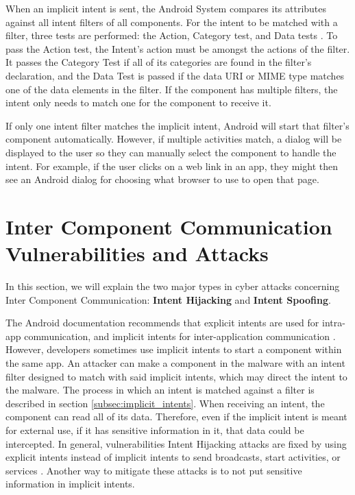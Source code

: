     When an implicit intent is sent, the Android System compares its attributes against all intent filters of all components. For the intent to be matched with a filter, three tests are performed: the Action, Category test, and Data tests \cite{intents_and_intent_filters}. To pass the Action test, the Intent’s action must be amongst the actions of the filter. It passes the Category Test if all of its categories are found in the filter’s declaration, and the Data Test is passed if the data URI or MIME type matches one of the data elements in the filter. If the component has multiple filters, the intent only needs to match one for the component to receive it.
    
    If only one intent filter matches the implicit intent, Android will start that filter’s component automatically. However, if multiple activities match, a dialog will be displayed to the user so they can manually select the component to handle the intent. For example, if the user clicks on a web link in an app, they might then see an Android dialog for choosing what browser to use to open that page.
    
    \section{Inter Component Communication Vulnerabilities and Attacks}
        \label{sec:icc_vulnerabilities_and_attacks}
        
    In this section, we will explain the two major types in cyber attacks concerning Inter Component Communication: \textbf{Intent Hijacking} and \textbf{Intent Spoofing}.
        
    The Android documentation recommends that explicit intents are used for intra-app communication, and implicit intents for inter-application communication \cite{intents_and_intent_filters}. However, developers sometimes use implicit intents to start a component within the same app. An attacker can make a component in the malware with an intent filter designed to match with said implicit intents, which may direct the intent to the malware. The process in which an intent is matched against a filter is described in section \ref{subsec:implicit_intents}. When receiving an intent, the component can read all of its data. Therefore, even if the implicit intent is meant for external use, if it has sensitive information in it, that data could be intercepted. In general, vulnerabilities Intent Hijacking attacks are fixed by using explicit intents instead of implicit intents to send broadcasts, start activities, or services \cite{2010_icc_paper}. Another way to mitigate these attacks is to not put sensitive information in implicit intents.
    
